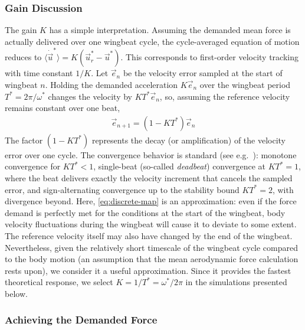 \documentclass[11pt,letterpaper]{article}
\begin{document}
\subsubsection{Gain Discussion}

The gain $K$ has a simple interpretation. Assuming the demanded
mean force is actually delivered over one wingbeat cycle, the cycle-averaged
equation of motion reduces to  $\langle \dot{\vec{u}}^* \rangle =
K \left( \vec{u}^*_r - \vec{u}^* \right)$. This corresponds to
first-order velocity tracking with time constant $1/K$.
Let $\vec{e}_n$ be the velocity error sampled at the start of wingbeat $n$.
Holding the demanded acceleration $K \vec{e}_n$ over the wingbeat period
$T^* = 2\pi/\omega^*$ changes the velocity by $K T^* \vec{e}_n$,
so, assuming the reference velocity remains constant over one beat,
\begin{align}
    \vec{e}_{n+1} = \left( 1 - K T^* \right) \vec{e}_n
    \label{eq:discrete-map}
\end{align}
The factor $\left( 1 - K T^* \right)$ represents the
decay (or amplification) of the velocity error over one cycle.
The convergence behavior is standard (see e.g.~\cite{astrom1997}): monotone convergence for
$K T^* < 1$, single-beat (so-called \emph{deadbeat}) convergence at $K T^* = 1$,
where the beat delivers exactly the velocity increment that
cancels the sampled error, and sign-alternating convergence up to
the stability bound $K T^* = 2$, with divergence beyond.
Here, \autoref{eq:discrete-map} is an approximation:
even if the force demand is perfectly met for the conditions
at the start of the wingbeat, body velocity fluctuations during
the wingbeat will cause it to deviate to some extent.
The reference velocity itself may also have changed by
the end of the wingbeat.
Nevertheless, given the relatively short timescale of the wingbeat
cycle compared to the body motion (an assumption that the mean aerodynamic
force calculation rests upon), we consider it a useful approximation.
Since it provides the fastest theoretical response, we select
$K = 1/T^* = \omega^*/2\pi$ in the simulations presented below.

\subsubsection{Achieving the Demanded Force}\label{sec:force_demand}
\end{document}
